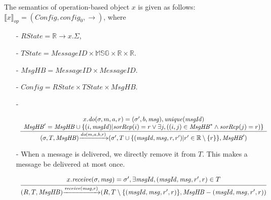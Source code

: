 The semantics of operation-based object $x$ is given as follows: $\llbracket x \rrbracket_{\mathit{op}} = (\mathit{Config},\mathit{config}_0,\rightarrow)$, where

\begin{itemize}
\setlength{\itemsep}{0.5pt}
\item[-] $\mathit{RState} = \mathbb{R} \rightarrow x.\Sigma$,

\item[-] $\mathit{TState} = \mathit{MessageID} \times \mathbb{MSG} \times \mathbb{R} \times \mathbb{R}$.

\item[-] $\mathit{MsgHB} = \mathit{MessageID} \times \mathit{MessageID}$.

\item[-] $\mathit{Config} = \mathit{RState} \times \mathit{TState} \times \mathit{MsgHB}$.

\item[-]

$\begin{array}{l c}
   \bigfrac{
   \begin{array}{c}
     x.\mathit{do}(\sigma,m,a,r) = (\sigma',b,\mathit{msg}), \mathit{unique}(\mathit{msgId})\\
     \mathit{MsgHB}' = \mathit{MsgHB} \cup \{ (i,\mathit{msgId}) \vert \mathit{sorRep}(i) = r \vee \exists j, ( (i,j) \in \mathit{MsgHB}^* \wedge \mathit{sorRep}(j) = r) \}
   \end{array}}
     {(\sigma,T,\mathit{MsgHB}) {\xrightarrow{\mathit{do}(m,a,b,r)}} (\sigma',T \cup \{ (\mathit{msgId},\mathit{msg},r,r') \vert r' \in \mathbb{R} \setminus \{ r \} \},\mathit{MsgHB}')}
\end{array}$

\item[-] When a message is delivered, we directly remove it from $T$. This makes a message be delivered at most once.

$\begin{array}{l c}
   \bigfrac{
   \begin{array}{c}
      x.\mathit{receive}(\sigma,\mathit{msg}) = \sigma',\exists \mathit{msgId},(\mathit{msgId},\mathit{msg},r',r) \in T
   \end{array}}
     {(R,T,\mathit{MsgHB}) {\xrightarrow{\mathit{receive}(\mathit{msg},r)}} (R,T \setminus \{ (\mathit{msgId},\mathit{msg},r',r) \},\mathit{MsgHB} - (\mathit{msgId},\mathit{msg},r',r) )}
\end{array}$
\end{itemize}


